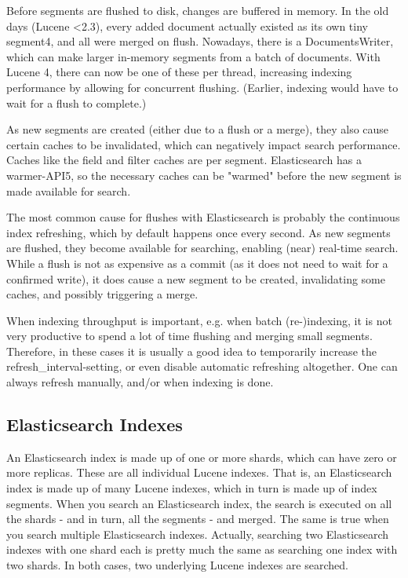 Before segments are flushed to disk, changes are buffered in memory. In the old days (Lucene <2.3), every added document actually existed as its own tiny segment4, and all were merged on flush. Nowadays, there is a DocumentsWriter, which can make larger in-memory segments from a batch of documents. With Lucene 4, there can now be one of these per thread, increasing indexing performance by allowing for concurrent flushing. (Earlier, indexing would have to wait for a flush to complete.)

As new segments are created (either due to a flush or a merge), they also cause certain caches to be invalidated, which can negatively impact search performance. Caches like the field and filter caches are per segment. Elasticsearch has a warmer-API5, so the necessary caches can be "warmed" before the new segment is made available for search.

The most common cause for flushes with Elasticsearch is probably the continuous index refreshing, which by default happens once every second. As new segments are flushed, they become available for searching, enabling (near) real-time search. While a flush is not as expensive as a commit (as it does not need to wait for a confirmed write), it does cause a new segment to be created, invalidating some caches, and possibly triggering a merge.

When indexing throughput is important, e.g. when batch (re-)indexing, it is not very productive to spend a lot of time flushing and merging small segments. Therefore, in these cases it is usually a good idea to temporarily increase the refresh\_interval-setting, or even disable automatic refreshing altogether. One can always refresh manually, and/or when indexing is done.

\subsection*{Elasticsearch Indexes}

An Elasticsearch index is made up of one or more shards, which can have zero or more replicas. These are all individual Lucene indexes. That is, an Elasticsearch index is made up of many Lucene indexes, which in turn is made up of index segments. When you search an Elasticsearch index, the search is executed on all the shards - and in turn, all the segments - and merged. The same is true when you search multiple Elasticsearch indexes. Actually, searching two Elasticsearch indexes with one shard each is pretty much the same as searching one index with two shards. In both cases, two underlying Lucene indexes are searched.

